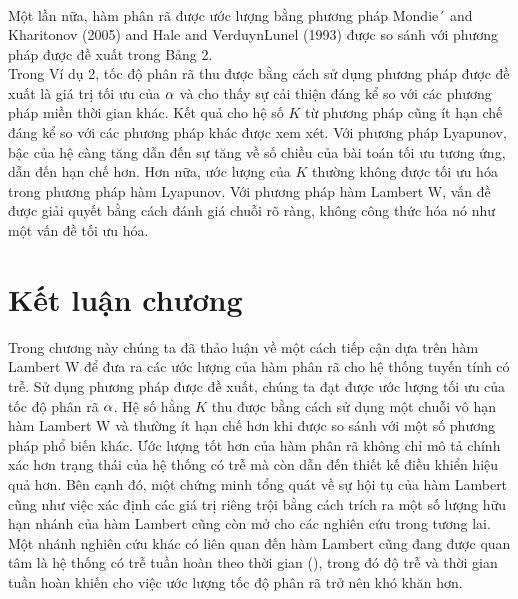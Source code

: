 \begin{vd}
\begin{align*}
\end{align*}
Một lần nữa, hàm phân rã được ước lượng bằng phương pháp Mondie´ and Kharitonov (2005) and Hale and VerduynLunel (1993) được so sánh với phương pháp được đề xuất trong Bảng 2.\\
Trong Ví dụ 2, tốc độ phân rã thu được bằng cách sử dụng phương pháp được đề xuất là giá trị tối ưu của $\alpha$ và cho thấy sự cải thiện đáng kể so với các phương pháp miền thời gian khác.
Kết quả cho hệ số $K$ từ phương pháp cũng ít hạn chế đáng kể so với các phương pháp khác được xem xét. Với phương pháp Lyapunov,  bậc của hệ càng tăng dẫn đến sự tăng về số chiều của bài toán tối ưu tương ứng, dẫn đến hạn chế hơn. Hơn nữa, ước lượng của $K$ thường không được tối ưu hóa trong phương pháp hàm Lyapunov. Với phương pháp hàm Lambert W, vấn đề được giải quyết bằng cách đánh giá chuỗi rõ ràng, không công thức hóa nó như một vấn đề tối ưu hóa.
\end{vd}


\section{Kết luận chương}
Trong chương này chúng ta đã thảo luận về một cách tiếp cận dựa trên hàm Lambert W để đưa ra các ước lượng của hàm phân rã cho hệ thống tuyến tính có trễ. 
Sử dụng phương pháp được đề xuất, chúng ta đạt được ước lượng tối ưu của tốc độ phân rã $\alpha$. Hệ số hằng $K$ thu được bằng cách sử dụng một chuỗi vô hạn hàm Lambert W và thường ít hạn chế hơn khi được so sánh với một số phương pháp phổ biến khác. Ước lượng tốt hơn của hàm phân rã không chỉ mô tả chính xác hơn trạng thái của hệ thống có trễ mà còn dẫn đến thiết kế điều khiển hiệu quả hơn. Bên cạnh đó, một chứng minh tổng quát 
về sự hội tụ của hàm Lambert cũng như việc xác định các giá trị riêng trội bằng cách trích ra một số lượng hữu hạn nhánh của hàm Lambert cũng còn mở cho các nghiên cứu trong tương lai. 
Một nhánh nghiên cứu khác có liên quan đến hàm Lambert cũng đang được quan tâm là hệ thống có trễ tuần hoàn theo thời gian (\cite{Ins02, Ins10}), trong đó độ trễ và thời gian tuần hoàn khiến cho việc ước lượng tốc độ phân rã trở nên khó khăn hơn. 






